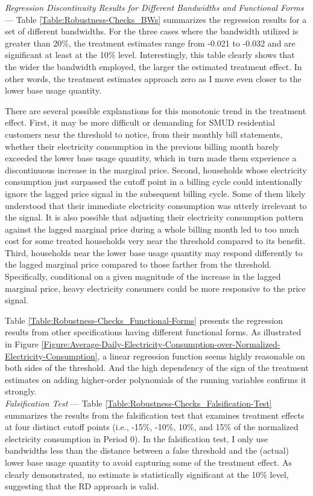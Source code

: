 \noindent
\textit{Regression Discontinuity Results for Different Bandwidths and Functional Forms} 
--- 
Table \ref{Table:Robustness-Checks_BWs} summarizes the regression results for a set of different bandwidths. For the three cases where the bandwidth utilized is greater than 20\%, the treatment estimates range from -0.021 to -0.032 and are significant at least at the 10\% level. Interestingly, this table clearly shows that the wider the bandwidth employed, the larger the estimated treatment effect. In other words, the treatment estimates approach zero as I move even closer to the lower base usage quantity.

There are several possible explanations for this monotonic trend in the treatment effect. First, it may be more difficult or demanding for SMUD residential customers near the threshold to notice, from their monthly bill statements, whether their electricity consumption in the previous billing month barely exceeded the lower base usage quantity, which in turn made them experience a discontinuous increase in the marginal price. Second, households whose electricity consumption just surpassed the cutoff point in a billing cycle could intentionally ignore the lagged price signal in the subsequent billing cycle. Some of them likely understood that their immediate electricity consumption was utterly irrelevant to the signal. It is also possible that adjusting their electricity consumption pattern against the lagged marginal price during a whole billing month led to too much cost for some treated households very near the threshold compared to its benefit. Third, households near the lower base usage quantity may respond differently to the lagged marginal price compared to those farther from the threshold. Specifically, conditional on a given magnitude of the increase in the lagged marginal price, heavy electricity consumers could be more responsive to the price signal. 

Table \ref{Table:Robustness-Checks_Functional-Forms} presents the regression results from other specifications having different functional forms. As illustrated in Figure \ref{Figure:Average-Daily-Electricity-Consumption-over-Normalized-Electricity-Consumption}, a linear regression function seems highly reasonable on both sides of the threshold. And the high dependency of the sign of the treatment estimates on adding higher-order polynomials of the running variables confirms it strongly. 
\\

\noindent
\textit{Falsification Test} 
---
Table \ref{Table:Robustness-Checks_Falsification-Test} summarizes the results from the falsification test that examines treatment effects at four distinct cutoff points (i.e., -15\%, -10\%, 10\%, and 15\% of the normalized electricity consumption in Period 0). In the falsification test, I only use bandwidths less than the distance between a false threshold and the (actual) lower base usage quantity to avoid capturing some of the treatment effect. As clearly demonstrated, no estimate is statistically significant at the 10\% level, suggesting that the RD approach is valid. 
